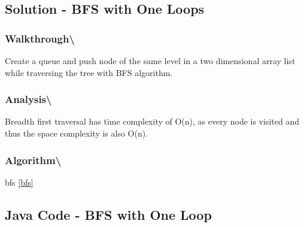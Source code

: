 \documentclass[]{book}
\begin{document}
\hypertarget{solution---bfs-with-one-loops}{%
\subsection{Solution - BFS with One Loops}\label{solution---bfs-with-one-loops}}

\hypertarget{walkthrough-55}{%
\subsubsection{Walkthrough\textbackslash{}}\label{walkthrough-55}}

Create a queue and push node of the same level in a two dimensional array list while traversing the tree with
BFS algorithm.

\hypertarget{analysis-62}{%
\subsubsection{Analysis\textbackslash{}}\label{analysis-62}}

Breadth first traversal has time complexity of O(n), as every node is visited and thus the space
complexity is also O(n).

\hypertarget{algorithm-64}{%
\subsubsection{Algorithm\textbackslash{}}\label{algorithm-64}}

bfs \ref{bfs}

\hypertarget{java-code---bfs-with-one-loop}{%
\subsection{Java Code - BFS with One Loop}\label{java-code---bfs-with-one-loop}}
\end{document}
